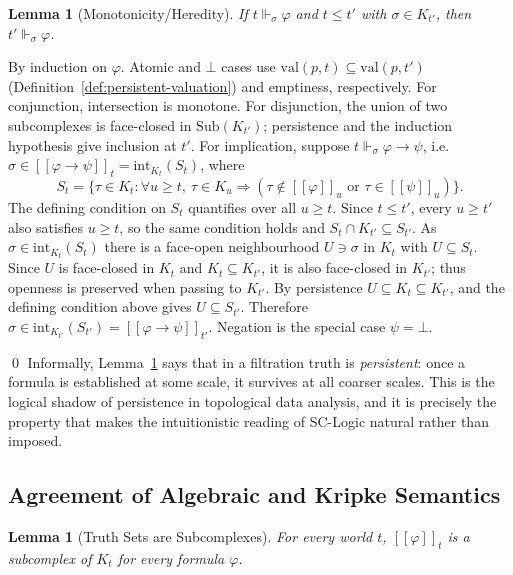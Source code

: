\documentclass[final,12pt]{elsarticle}
\newcommand{\llbracket}{[\![}
\newcommand{\rrbracket}{]\!]}
\theoremstyle{plain}
\newtheorem{lem}[thm]{Lemma}
\theoremstyle{definition}
\begin{document}
\begin{lem}[Monotonicity/Heredity]
\label{lem:heredity}
If \(t \Vdash_\sigma \varphi\) and \(t \leq t'\) with \(\sigma \in K_{t'}\), then \(t' \Vdash_\sigma \varphi\).
\end{lem}

\proof
By induction on \(\varphi\). Atomic and \(\bot\) cases use \(\mathrm{val}(p,t)\subseteq \mathrm{val}(p,t')\) (Definition~\ref{def:persistent-valuation}) and emptiness, respectively.
For conjunction, intersection is monotone.
For disjunction, the union of two subcomplexes is face-closed in \(\mathrm{Sub}(K_{t'})\); persistence and the induction hypothesis give inclusion at \(t'\).
For implication, suppose \(t\Vdash_\sigma\varphi\to\psi\), i.e.\
\(\sigma\in\llbracket\varphi\to\psi\rrbracket_t=\mathrm{int}_{K_t}(S_t)\), where
\[
S_t=\{\tau\in K_t:\forall u\ge t,\ \tau\in K_u\Rightarrow
(\tau\notin\llbracket\varphi\rrbracket_u\text{ or }\tau\in\llbracket\psi\rrbracket_u)\}.
\]
The defining condition on \(S_t\) quantifies over all \(u\ge t\). Since \(t\le t'\),
every \(u\ge t'\) also satisfies \(u\ge t\), so the same condition holds and
\(S_t\cap K_{t'}\subseteq S_{t'}\). As \(\sigma\in\mathrm{int}_{K_t}(S_t)\) there is a
  face-open neighbourhood \(U\ni\sigma\) in \(K_t\) with \(U\subseteq S_t\). Since
  \(U\) is face-closed in \(K_t\) and \(K_t\subseteq K_{t'}\), it is also face-closed
  in \(K_{t'}\); thus openness is preserved when passing to \(K_{t'}\). By persistence
  \(U\subseteq K_t\subseteq K_{t'}\), and the defining condition above gives
  \(U\subseteq S_{t'}\). Therefore
  \(\sigma\in\mathrm{int}_{K_{t'}}(S_{t'})=\llbracket\varphi\to\psi\rrbracket_{t'}\).
Negation is the special case \(\psi=\bot\).

\qed
Informally, Lemma~\ref{lem:heredity} says that in a filtration truth is
\emph{persistent}: once a formula is established at some scale, it survives at
all coarser scales. This is the logical shadow of persistence in topological
data analysis, and it is precisely the property that makes the intuitionistic
reading of SC-Logic natural rather than imposed.

\subsection{Agreement of Algebraic and Kripke Semantics}
\label{subsec:agreement}

\begin{lem}[Truth Sets are Subcomplexes]
\label{lem:truth-set-subcomplex}
For every world \(t\), \(\llbracket \varphi \rrbracket_t\) is a subcomplex of \(K_t\) for every formula \(\varphi\).
\end{lem}
\end{document}
